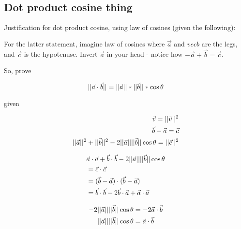 \documentclass{article}
\DeclarePairedDelimiter\magn{\lvert\lvert}{\rvert\rvert}
\begin{document}
\subsection*{Dot product cosine thing}

Justification for dot product cosine, using law of cosines (given the following):

For the latter statement, imagine law of cosines where $\vec a$ and $vec b$ are the legs, and $\vec c$ is the hypotenuse.  Invert $\vec a$ in your head - notice how $-\vec a+\vec b=\vec c$.

So, prove

\begin{align*}
  \magn{\vec{a}\cdot\vec{b}}=\magn{\vec{a}}*\magn{\vec{b}}*\cos\theta
\end{align*}

given

\begin{align*}
  \vec v=\magn{\vec v}^2\\
  \vec b-\vec a=\vec c\\
  \magn{\vec a}^2+\magn{\vec b}^2-2\magn{\vec a}\magn{\vec b}\cos\theta=\magn{\vec c}^2
\end{align*}


\begin{align*}
  &\vec a\cdot\vec a+\vec b\cdot\vec b-2\magn{\vec a}\magn{\vec b}\cos\theta\\
  &=\vec c\cdot\vec c\\
  &=(\vec b-\vec a)\cdot(\vec b-\vec a)\\
  &=\vec b\cdot\vec b-2\vec b\cdot\vec a+\vec a\cdot\vec a
\end{align*}

\begin{align*}
  -2\magn{\vec a}\magn{\vec b}\cos\theta&=-2\vec a\cdot\vec b\\
  \magn{\vec a}\magn{\vec b}\cos\theta&=\vec a\cdot\vec b
\end{align*}
\end{document}
